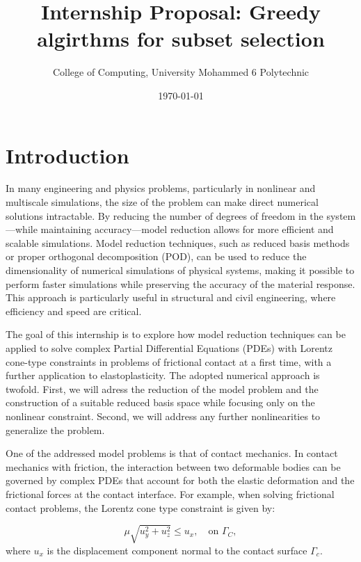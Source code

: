 \documentclass[12pt]{article}
\title{Internship Proposal: Greedy algirthms for subset selection}
\author{
	College of Computing, University Mohammed 6 Polytechnic \\
}
\date{\today}
\begin{document}
	
	\maketitle
	
	\section{Introduction}
	In many engineering and physics problems, particularly in nonlinear and multiscale simulations, the size of the problem can make direct numerical solutions intractable. By reducing the number of degrees of freedom in the system—while maintaining accuracy—model reduction allows for more efficient and scalable simulations. 
	Model reduction techniques, such as reduced basis methods or proper orthogonal decomposition (POD), can be used to reduce the dimensionality of numerical simulations of physical systems, making it possible to perform faster simulations while preserving the accuracy of the material response. This approach is particularly useful in structural and civil engineering, where efficiency and speed are critical.
	
	The goal of this internship is to explore how model reduction techniques can be applied to solve complex Partial Differential Equations (PDEs) with Lorentz cone-type constraints in problems of frictional contact at a first time, with a further application to elastoplasticity. 
	The adopted numerical approach is twofold. First, we will adress the reduction of the model problem and the construction of a suitable reduced basis space while focusing only on the nonlinear constraint. 
	Second, we will address any further nonlinearities to generalize the problem.
	
	One of the addressed model problems is that of contact mechanics. In contact mechanics with friction, the interaction between two deformable bodies can be governed by complex PDEs that account for both the elastic deformation and the frictional forces at the contact interface. 
	For example, when solving frictional contact problems, the Lorentz cone type constraint is given by:
	
	\begin{equation}
		\mu\sqrt{u_y^2+u_z^2}\leq u_x, \quad \text{on } \Gamma_C,
	\end{equation}
	where $u_x$ is the displacement component normal to the contact surface $\Gamma_c$.
	
	
\end{document}
